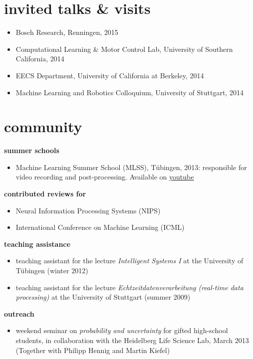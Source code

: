 \documentclass[]{k-cv} %
\begin{document}
\section{invited talks \& visits} \bodyfont
\begin{itemize}
 \item Bosch Research, Renningen, 2015
 \item Computational Learning \& Motor Control Lab, University of Southern
California, 2014
 \item EECS Department, University of California at Berkeley, 2014
 \item Machine Learning and Robotics Colloquium, University of Stuttgart, 2014
\end{itemize}



\section{community} \bodyfont
{\Large \bfseries summer schools}
\begin{itemize}
 \item Machine Learning Summer School (MLSS), T\"ubingen, 2013: responsible for
video recording and post-processing.
Available on \href{
https://www.youtube.com/playlist?list=PLqJm7Rc5-EXFv6RXaPZzzlzo93Hl0v91E } { \to
youtube}
\end{itemize}

{\Large \bfseries contributed reviews for}
\begin{itemize}
 \item Neural Information Processing Systems (NIPS)
 \item International Conference on Machine Learning (ICML)
\end{itemize}

{\Large \bfseries teaching assistance}
\begin{itemize}
 \item teaching assistant for the lecture \emph{Intelligent Systems I} at the
University of T\"ubingen (winter 2012)
\item teaching assistant for the lecture \emph{Echtzeitdatenverarbeitung
(real-time data processing)} at the University of Stuttgart (summer 2009)
\end{itemize}

{\Large \bfseries outreach}
\begin{itemize}
 \item weekend seminar on \emph{probability and uncertainty} for gifted
high-school students, in collaboration with the Heidelberg Life Science Lab,
March 2013 (Together with Philipp Hennig and Martin Kiefel)
\end{itemize}
\end{document}

